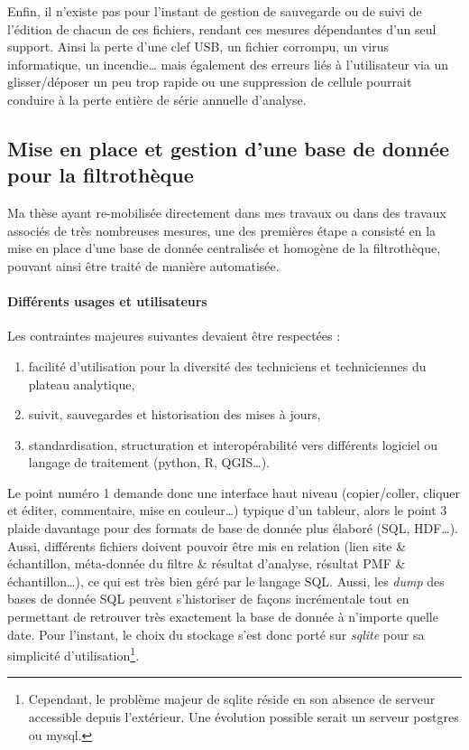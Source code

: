 Enfin, il n'existe pas pour l'instant de gestion de sauvegarde ou de suivi de l'édition
de chacun de ces fichiers, rendant ces mesures dépendantes d'un seul support. Ainsi la perte
d'une clef USB, un fichier corrompu, un virus informatique, un incendie… mais également
des erreurs liés à l'utilisateur via un glisser/déposer un peu trop rapide ou une
suppression de cellule pourrait conduire à la perte entière de série annuelle d'analyse.

\subsection{Mise en place et gestion d'une base de donnée pour la filtrothèque}%
\label{sub:mise_en_place_et_gestion_d_une_base_de_donnée_pour_la_filtrothèque}

Ma thèse ayant re-mobilisée directement dans mes travaux ou dans des travaux associés de
très nombreuses mesures, une des premières étape a consisté en la mise en place d'une base
de donnée centralisée et homogène de la filtrothèque, pouvant ainsi être traité de manière
automatisée.

\paragraph{Différents usages et utilisateurs}%
\label{par:différents_usages_et_utilisateurs}

Les contraintes majeures suivantes devaient être respectées :
\begin{enumerate}
    \item facilité d'utilisation pour la diversité des techniciens et techniciennes du
        plateau analytique,
    \item suivit, sauvegardes et historisation des mises à jours,
    \item standardisation, structuration et interopérabilité vers différents logiciel ou
        langage de traitement (python, R, QGIS…).
\end{enumerate}
Le point numéro 1 demande donc une interface haut niveau (copier/coller, cliquer et
éditer, commentaire, mise en couleur…) typique d'un tableur, alors le point 3 plaide
davantage pour des formats de base de donnée plus élaboré (SQL, HDF…).
Aussi, différents fichiers doivent pouvoir être mis en relation (lien site \& échantillon, méta-donnée du
filtre \& résultat d'analyse, résultat PMF \& échantillon…), ce qui est très bien géré
par le langage SQL. Aussi, les \textit{dump} des bases de donnée SQL peuvent s'historiser
de façons incrémentale tout en permettant de retrouver très exactement la base de donnée à
n'importe quelle date. 
Pour l'instant, le choix du stockage s'est donc porté sur \textit{sqlite} pour sa
simplicité d'utilisation\footnote{Cependant, le problème majeur de sqlite réside en son
    absence de serveur accessible depuis l'extérieur. Une évolution possible serait un
serveur postgres ou mysql.}.

